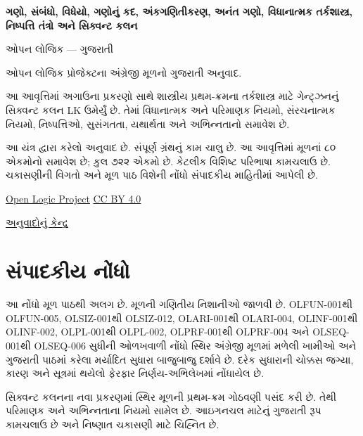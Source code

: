 \renewcommand{\ref}[1]{%
  \ifcsname guexternalref@#1\endcsname
    \csname guexternalref@#1\endcsname
  \else
    \guoriginalref{#1}%
  \fi}
\begin{titlepage}
{\LARGE\bfseries ગણો, સંબંધો, વિધેયો, ગણોનું કદ, અંકગણિતીકરણ,
અનંત ગણો, વિધાનાત્મક તર્કશાસ્ત્ર, નિષ્પત્તિ તંત્રો અને સિક્વન્ટ કલન\par}
\vspace{1em}
{\Large ઓપન લોજિક — ગુજરાતી\par}
\vspace{2em}
ઓપન લોજિક પ્રોજેક્ટના અંગ્રેજી મૂળનો ગુજરાતી અનુવાદ.\par
\vspace{1em}
આ આવૃત્તિમાં અગાઉના પ્રકરણો સાથે શાસ્ત્રીય પ્રથમ-ક્રમના તર્કશાસ્ત્ર
માટે ગેન્ટ્ઝનનું સિક્વન્ટ કલન LK ઉમેર્યું છે. તેમાં વિધાનાત્મક અને
પરિમાણક નિયમો, સંરચનાત્મક નિયમો, નિષ્પત્તિઓ, સુસંગતતા, યથાર્થતા અને
અભિન્નતાનો સમાવેશ છે.\par
\vfill
આ યંત્ર દ્વારા કરેલો અનુવાદ છે. સંપૂર્ણ ગ્રંથનું કામ ચાલુ છે.
આ આવૃત્તિમાં મૂળનાં ૮૦ એકમોનો સમાવેશ છે; કુલ ૭૨૨ એકમો છે.
કેટલીક વિશિષ્ટ પરિભાષા કામચલાઉ છે. ચકાસણીની વિગતો અને
મૂળ પાઠ વિશેની નોંધો સંપાદકીય માહિતીમાં આપેલી છે.\par
\vspace{1em}
\href{https://github.com/OpenLogicProject/OpenLogic}{Open Logic Project}
\quad \href{https://creativecommons.org/licenses/by/4.0/}{CC BY 4.0}\par
\href{https://github.com/KokunoYumeto/OpenLogic-translations}{અનુવાદોનું કેન્દ્ર}\par
\end{titlepage}
\tableofcontents
\clearpage

\clearpage
\section*{સંપાદકીય નોંધો}
આ નોંધો મૂળ પાઠથી અલગ છે. મૂળની ગણિતીય નિશાનીઓ જાળવી છે.
OLFUN-001થી OLFUN-005, OLSIZ-001થી OLSIZ-012, OLARI-001થી
OLARI-004, OLINF-001થી OLINF-002, OLPL-001થી OLPL-002,
OLPRF-001થી OLPRF-004 અને OLSEQ-001થી OLSEQ-006 સુધીની ઓળખવાળી
નોંધો સ્થિર અંગ્રેજી મૂળમાં મળેલી ખામીઓ અને ગુજરાતી પાઠમાં કરેલા
મર્યાદિત સુધારા બાજુબાજુ દર્શાવે છે. દરેક સુધારાની ચોક્કસ જગ્યા,
કારણ અને સૂત્રમાં થયેલો ફેરફાર નિર્ણય-અભિલેખમાં નોંધાયેલ છે.

સિક્વન્ટ કલનના નવા પ્રકરણમાં સ્થિર મૂળની પ્રથમ-ક્રમ ગોઠવણી પસંદ કરી
છે. તેથી પરિમાણક અને અભિન્નતાના નિયમો સામેલ છે. આઇગનચલ માટેનું
ગુજરાતી રૂપ કામચલાઉ છે અને નિષ્ણાત ચકાસણી માટે ચિહ્નિત છે.

